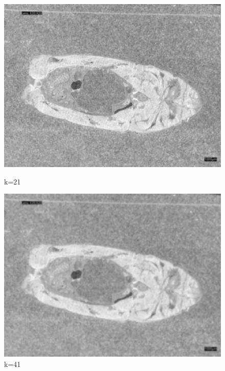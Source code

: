 \begin{figure}
    \centering
    \begin{minipage}{0.24\textwidth}
        \centering
        \includegraphics[width=\textwidth]{./fig/gausssian/blurred21.jpg}
        \caption*{k=21}
        \label{fig:blurred21}
    \end{minipage}
    \begin{minipage}{0.24\textwidth}
        \centering
        \includegraphics[width=\textwidth]{./fig/gausssian/blurred41.jpg}
        \caption*{k=41}
        \label{fig:blurred41}
    \end{minipage}
    \begin{minipage}{0.24\textwidth}
        \centering

\end{minipage}
\end{figure}
